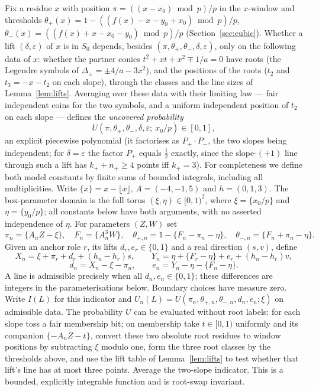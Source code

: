 Fix a residue $x$ with position $\pi=((x-x_0)\bmod p)/p$ in the $x$-window and thresholds $\theta_+(x)=1-((f(x)-x-y_0+x_0)\bmod p)/p$,
$\theta_-(x)=((f(x)+x-x_0-y_0)\bmod p)/p$ (Section~\ref{sec:cubic}).  Whether a lift $(\delta,\varepsilon)$ of $x$ is in $S_0$ depends, besides
$(\pi,\theta_+,\theta_-,\delta,\varepsilon)$, only on the following data of $x$: whether the partner conics $t^2+xt+x^2\mp1/a=0$ have roots (the
Legendre symbols of $\Delta_\pm=\pm4/a-3x^2$), and the positions of the roots ($t_2$ and $t_3=-x-t_2$ on each slope), through the classes and the line
sizes of Lemma~\ref{lem:lifts}.  Averaging over these data with their limiting law — fair independent coins for the two symbols, and a uniform independent
position of $t_2$ on each slope — defines the \emph{uncovered probability}
\[
 U(\pi,\theta_+,\theta_-,\delta,\varepsilon;\ x_0/p)\in[0,1],
\]
an explicit piecewise polynomial (it factorises as $P_+\cdot P_-$, the two slopes being independent; for $\delta=\varepsilon$ the factor $P_+$ equals
$\tfrac12$ exactly, since the slope-$(+1)$ line through such a lift has $k_++n_+\ge4$ points iff $k_+=3$).
For completeness we define both model constants by finite sums of bounded integrals, including all multiplicities.
Write $\{x\}=x-\lfloor x\rfloor$, $A=(-4,-1,5)$ and $h=(0,1,3)$.
The box-parameter domain is the full torus $(\xi,\eta)\in[0,1)^2$, where $\xi=\{x_0/p\}$ and $\eta=\{y_0/p\}$;
all constants below have both arguments, with no asserted independence of $\eta$.
For parameters $(Z,W)$ set
\[
 \pi_n=\{A_nZ-\xi\},\quad F_n=\{A_n^3W\},\quad
 \theta_{+,n}=1-\{F_n-\pi_n-\eta\},\quad
 \theta_{-,n}=\{F_n+\pi_n-\eta\}.
\]
Given an anchor role $r$, its lifts $d_r,e_r\in\{0,1\}$ and a real direction $(s,v)$, define
\[
 X_n=\xi+\pi_r+d_r+(h_n-h_r)s,\qquad
 Y_n=\eta+\{F_r-\eta\}+e_r+(h_n-h_r)v,
\]
\[
 d_n=X_n-\xi-\pi_n,\qquad e_n=Y_n-\eta-\{F_n-\eta\}.
\]
A line is admissible precisely when all $d_n,e_n\in\{0,1\}$; these differences are integers in the parameterisations below.
Boundary choices have measure zero.  Write $I(L)$ for this indicator and
$U_n(L)=U(\pi_n,\theta_{+,n},\theta_{-,n},d_n,e_n;\xi)$ on admissible data.
The probability $U$ can be evaluated without root labels: for each slope toss a fair membership bit; on membership take
$t\in[0,1)$ uniformly and its companion $\{-A_nZ-t\}$, convert these two absolute root residues to window positions by subtracting $\xi$ modulo one, form the three root classes by the thresholds above,
and use the lift table of Lemma~\ref{lem:lifts} to test whether that lift's line has at most three points.
Average the two-slope indicator.  This is a bounded, explicitly integrable function and is root-swap invariant.

